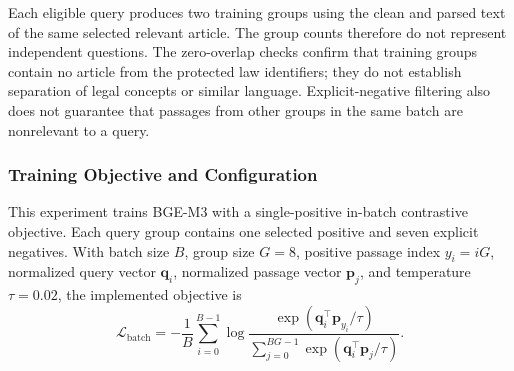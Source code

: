Each eligible query produces two training groups using the clean and parsed text of the same selected relevant article. The group counts therefore do not represent independent questions. The zero-overlap checks confirm that training groups contain no article from the protected law identifiers; they do not establish separation of legal concepts or similar language. Explicit-negative filtering also does not guarantee that passages from other groups in the same batch are nonrelevant to a query.

\subsubsection{Training Objective and Configuration}

This experiment trains BGE-M3 with a single-positive in-batch contrastive objective. Each query group contains one selected positive and seven explicit negatives. With batch size \(B\), group size \(G=8\), positive passage index \(y_i=iG\), normalized query vector \(\mathbf q_i\), normalized passage vector \(\mathbf p_j\), and temperature \(\tau=0.02\), the implemented objective is
\[
\mathcal L_{\mathrm{batch}}=-\frac{1}{B}\sum_{i=0}^{B-1}
\log\frac{\exp(\mathbf q_i^\top\mathbf p_{y_i}/\tau)}
{\sum_{j=0}^{BG-1}\exp(\mathbf q_i^\top\mathbf p_j/\tau)}.
\]

